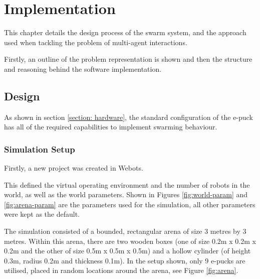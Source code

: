 \chapter{Implementation}
\label{chap:Implementation}

This chapter details the design process of the swarm system, and the approach used when tackling the problem of multi-agent interactions.

Firstly, an outline of the problem representation is shown and then the structure and reasoning behind the software implementation.

\section{Design}

As shown in section \ref{section: hardware}, the standard configuration of the e-puck has all of the required capabilities to implement swarming behaviour.

\subsection{Simulation Setup}

Firstly, a new project was created in Webots.

This defined the virtual operating environment and the number of robots in the world, as well as the world parameters. Shown in Figures \ref{fig:world-param} and \ref{fig:arena-param} are the parameters used for the simulation, all other parameters were kept as the default.

The simulation consisted of a bounded, rectangular arena of size 3 metres by 3 metres. Within this arena, there are two wooden boxes (one of size 0.2m x 0.2m x 0.2m and the other of size 0.5m x 0.5m x 0.5m) and a hollow cylinder (of height 0.3m, radius 0.2m and thickness 0.1m). In the setup shown, only 9 e-pucks are utilised, placed in random locations around the arena, see Figure \ref{fig:arena}.

